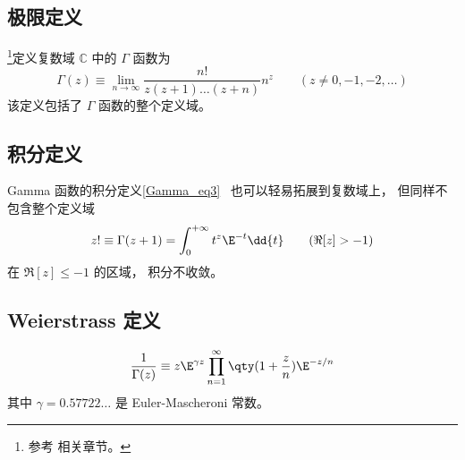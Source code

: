 

\subsection{极限定义}
\footnote{参考 \cite{Arfken} 相关章节。}定义复数域 $\mathbb C$ 中的 $\Gamma$ 函数为
\begin{equation}
\Gamma(z) \equiv \lim_{n\to\infty} \frac{n!}{z(z+1)\dots(z+n)}n^z \qquad (z \ne 0, -1, -2,\dots)
\end{equation}
该定义包括了 $\Gamma$ 函数的整个定义域。

\subsection{积分定义}
Gamma 函数的积分定义\autoref{Gamma_eq3}~ 也可以轻易拓展到复数域上， 但同样不包含整个定义域
\begin{equation}
z! \equiv \Gamma (z + 1) = \int_0^{+\infty} t^z \E^{-t} \dd{t} \qquad (\Re[z] > -1)
\end{equation}
在 $\Re[z] \leqslant -1$ 的区域， 积分不收敛。

\subsection{Weierstrass 定义}
\begin{equation}
\frac{1}{\Gamma(z)} \equiv z \E^{\gamma z} \prod_{n=1}^\infty \qty(1 + \frac{z}{n}) \E^{-z/n}
\end{equation}
其中 $\gamma = 0.57722\dots$ 是 Euler-Mascheroni 常数。

